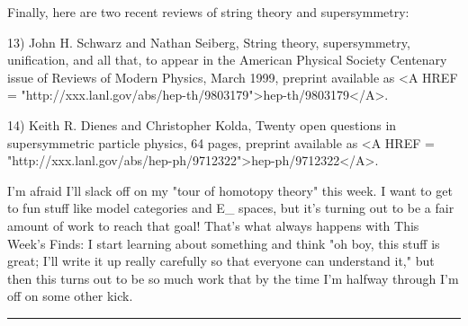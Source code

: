 Finally, here are two recent reviews of string theory and
supersymmetry:  

13) John H. Schwarz and Nathan Seiberg, String theory, supersymmetry, 
unification, and all that, to appear in the American Physical Society 
Centenary issue of Reviews of Modern Physics, March 1999, preprint
available as <A HREF = "http://xxx.lanl.gov/abs/hep-th/9803179">hep-th/9803179</A>.

14) Keith R. Dienes and Christopher Kolda, Twenty open questions in 
supersymmetric particle physics, 64 pages, preprint available as 
<A HREF = "http://xxx.lanl.gov/abs/hep-ph/9712322">hep-ph/9712322</A>.

I'm afraid I'll slack off on my "tour of homotopy theory"
this week.  I want to get to fun stuff like model categories and
E_{\infty } spaces, but it's turning out to be a fair amount
of work to reach that goal!  That's what always happens with This
Week's Finds: I start learning about something and think "oh boy,
this stuff is great; I'll write it up really carefully so that
everyone can understand it," but then this turns out to be so
much work that by the time I'm halfway through I'm off on some other
kick.


 \par\noindent\rule{\textwidth}{0.4pt}

